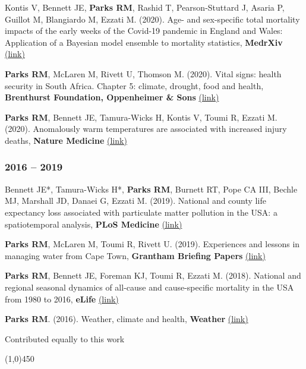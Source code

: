 \noindent Kontis V, Bennett JE, \textbf{Parks RM}, Rashid T, Pearson-Stuttard J, Asaria P, Guillot M, Blangiardo M, Ezzati M. (2020). Age- and sex-specific total mortality impacts of the early weeks of the Covid-19 pandemic in England and Wales: Application of a Bayesian model ensemble to mortality statistics, \textbf{MedrXiv} \href{https://www.medrxiv.org/content/10.1101/2020.05.20.20107680v1}{(link)} \bigskip

\noindent \textbf{Parks RM}, McLaren M, Rivett U, Thomson M. (2020). Vital signs: health security in South Africa. Chapter 5: climate, drought, food and health, \textbf{Brenthurst Foundation, Oppenheimer \& Sons} \href{http://www.thebrenthurstfoundation.org/article/vital-signs-health-security-in-south-africa/}{(link)} \bigskip

\noindent \textbf{Parks RM}, Bennett JE, Tamura-Wicks H, Kontis V, Toumi R, Ezzati M. (2020). Anomalously warm temperatures are associated with increased injury deaths, \textbf{Nature Medicine} \href{https://www.nature.com/articles/s41591-019-0721-y}{(link)}


% 


\subsubsection*{2016 -- 2019}

\noindent Bennett JE*, Tamura-Wicks H*, \textbf{Parks RM}, Burnett RT, Pope CA III, Bechle MJ, Marshall JD, Danaei G, Ezzati M. (2019). National and county life expectancy loss associated with particulate matter pollution in the USA: a spatiotemporal analysis, \textbf{PLoS Medicine} \href{https://doi.org/10.1371/journal.pmed.1002856}{(link)} \bigskip

\noindent \textbf{Parks RM}, McLaren M, Toumi R, Rivett U. (2019). Experiences and lessons in managing water from Cape Town, \textbf{Grantham Briefing Papers} \href{https://bit.ly/2Uu9oAh}{(link)} \bigskip

\noindent \textbf{Parks RM}, Bennett JE, Foreman KJ, Toumi R, Ezzati M. (2018). National and regional seasonal dynamics of all-cause and cause-specific mortality in the USA from 1980 to 2016, \textbf{eLife}  \href{https://doi.org/10.7554/eLife.35500}{(link)} \bigskip

\noindent \textbf{Parks RM}. (2016). Weather, climate and health, \textbf{Weather} \href{https://doi.org/10.1002/wea.2752}{(link)} \bigskip

\noindent * Contributed equally to this work

\begin{center} \line(1,0){450} \end{center}